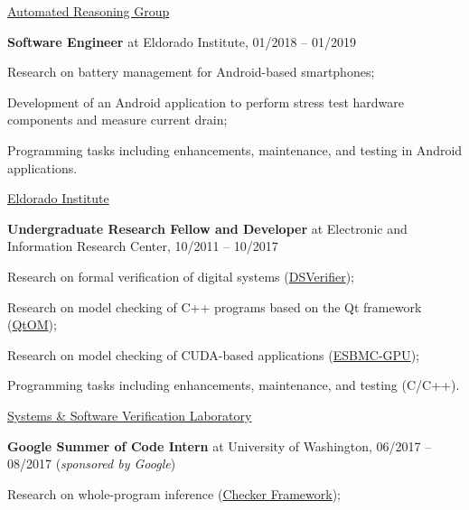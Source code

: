 \documentclass[letterpaper]{article}
\renewenvironment{itemize}{
  \begin{list}{}{
    \setlength{\leftmargin}{1.5em}
  }
}{
  \end{list}
}
\begin{document}
\begin{enumerate}
\begin{itemize}
        \item{\textendash} \href{https://aws.amazon.com/security/provable-security/?sc_channel=EL&sc_campaign=Promo_2018_vid&sc_medium=YouTube&sc_content=video3507&sc_detail=CAREERS&sc_country=US}{Automated Reasoning Group}
      \end{itemize}
         \item{{\bf Software Engineer} at Eldorado Institute, 01/2018 -- 01/2019}
      \begin{itemize}
        \item{\textendash} {Research on battery management for Android-based smartphones;}
        \item{\textendash} {Development of an Android application to perform stress test hardware components and measure current drain;}
        \item{\textendash} {Programming tasks including enhancements, maintenance, and testing in Android applications.}
        \item{\textendash} \href{http://eldorado.org.br/}{Eldorado Institute}
      \end{itemize}
     \item{{\bf Undergraduate Research Fellow and Developer} at Electronic and Information Research Center, 10/2011 -- 10/2017}
      \begin{itemize}
        \item{\textendash} {Research on formal verification of digital systems (\href{http://www.dsverifier.org/}{DSVerifier});}
        \item{\textendash} {Research on model checking of C++ programs based on the Qt framework (\href{http://www.esbmc/qtom/}{QtOM});}
        \item{\textendash} {Research on model checking of CUDA-based applications (\href{http://www.esbmc/gpu/}{ESBMC-GPU});}
        \item{\textendash} {Programming tasks including enhancements, maintenance, and testing (C/C++).}
        \item{\textendash} \href{https://ssvlab.github.io}{Systems \& Software Verification Laboratory}
      \end{itemize}
      \item{{\bf Google Summer of Code Intern} at University of Washington, 06/2017 -- 08/2017 ({\it sponsored by Google})} 
      \begin{itemize}
        \item{\textendash} {Research on whole-program inference (\href{https://checkerframework.org/}{Checker Framework});}

\end{itemize}
\end{enumerate}
\end{document}
